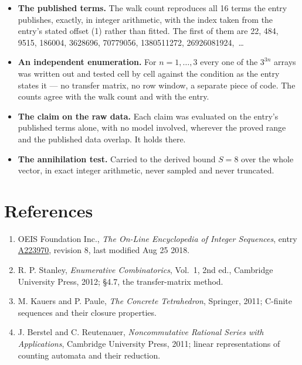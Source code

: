 \documentclass[11pt]{article}
\theoremstyle{definition}
\begin{document}
\begin{itemize}

\item {\bfseries The published terms.} The walk count reproduces all 16 terms the entry publishes, exactly, in integer arithmetic, with the index taken from the entry's stated offset (1) rather than fitted. The first of them are 22, 484, 9515, 186004, 3628696, 70779056, 1380511272, 26926081924,~\dots

\item {\bfseries An independent enumeration.} For $n = 1,\dots,3$ every one of the $3^{3n}$ arrays was written out and tested cell by cell against the condition as the entry states it --- no transfer matrix, no row window, a separate piece of code. The counts agree with the walk count and with the entry.

\item {\bfseries The claim on the raw data.} Each claim was evaluated on the entry's published terms alone, with no model involved, wherever the proved range and the published data overlap. It holds there.

\item {\bfseries The annihilation test.} Carried to the derived bound $S = 8$ over the whole vector, in exact integer arithmetic, never sampled and never truncated.

\end{itemize}

\section{References}

\begin{enumerate}

\item OEIS Foundation Inc., \emph{The On-Line Encyclopedia of Integer Sequences}, entry \href{https://oeis.org/A223970}{A223970}, revision 8, last modified Aug 25 2018.

\item R. P. Stanley, \emph{Enumerative Combinatorics}, Vol.~1, 2nd ed., Cambridge University Press, 2012; \S4.7, the transfer-matrix method.

\item M. Kauers and P. Paule, \emph{The Concrete Tetrahedron}, Springer, 2011; C-finite sequences and their closure properties.

\item J. Berstel and C. Reutenauer, \emph{Noncommutative Rational Series with Applications}, Cambridge University Press, 2011; linear representations of counting automata and their reduction.

\end{enumerate}
\end{document}
